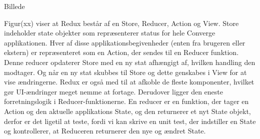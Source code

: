 Billede

Figur(xx) viser at Redux består af en Store, Reducer, Action og View. Store indeholder state objekter som repræsenterer status for hele Converge applikationen. Hver af disse applikationsbegivenheder (enten fra brugeren eller ekstern) er repræsenteret som en Action, der sendes til en Reducer funktion. Denne reducer opdaterer Store med en ny stat afhængigt af, hvilken handling den modtager. Og når en ny stat skubbes til Store og dette genskabes i View for at vise ændringerne. 
Redux er også med til at afkoble de fleste komponenter, hvilket gør UI-ændringer meget nemme at fortage. Derudover ligger den eneste forretningslogik i Reducer-funktionerne. En reducer er en funktion, der tager en Action og den aktuelle applikations State, og den returnerer et nyt State objekt, derfor er det ligetil at teste, fordi vi kan skrive en unit test, der indstiller en State og kontrollerer, at Reduceren returnerer den nye og ændret State.
